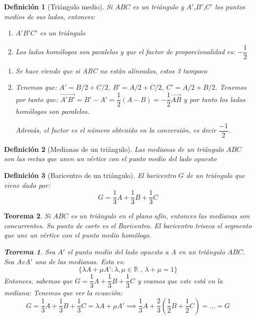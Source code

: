 \documentclass[11pt, a4paper, titlepage]{article}
\makeatletter
\renewenvironment{proof}[1][\proofname] {\vspace{-15pt}\par\pushQED{\qed}\normalfont\topsep6\p@\@plus6\p@\relax\trivlist\item[\hskip\labelsep\it#1\@addpunct{.}]\ignorespaces}{\popQED\endtrivlist\@endpefalse}
\newcommand{\R}{\mathbb{R}}
\theoremstyle{theorem-style}
\newtheorem*{nth}{Teorema}
\theoremstyle{definition-style}
\newtheorem*{ndef}{Definición}
\theoremstyle{remark-style}
\theoremstyle{example-style}
\newenvironment{nlist}
{\begin{enumerate}
\renewcommand\labelenumi{(\emph{\roman{enumi})}}}
{\end{enumerate}}
\makeatother
\begin{document}
\begin{ndef}[Triángulo medio]
	Si $ABC$ es un triángulo y $A'$,$B'$,$C'$ los puntos medios de sus lados, entonces:
	\begin{nlist}
	\item $A'B'C'$ es un triángulo
	\item Los lados homólogos son paralelos y que el factor de proporcionalidad es: $-\dfrac{1}{2}$
\end{nlist}\vspace{0.2cm}
\begin{proof}

	\begin{nlist}
	\item Se hace viendo que si ABC no están alineados, estos 3 tampoco
	\item Tenemos que: $A' = B/2 + C/2$, $B' = A/2+C/2$, $C' = A/2 + B/2$. Tenemos por tanto que: $\vec{A'B'} = B'-A' = \dfrac{1}{2}(A-B) = -\dfrac{1}{2} \vec{AB}$ y por tanto los lados homólogos son paralelos.

Además, el factor es el número obtenido en la conversión, es decir $\dfrac{-1}{2}$.
\end{nlist}
\end{proof}
\end{ndef}

\begin{ndef}[Medianas de un triángulo]
Las medianas de un triángulo $ABC$ son las rectas que unen un vértice con el punto medio del lado opuesto
\end{ndef}
\begin{ndef}[Baricentro de un triángulo]
	El baricentro $G$ de un triángulo que viene dado por:
	\[
	G = \dfrac{1}{3} A +  \dfrac{1}{3} B +  \dfrac{1}{3} C
	\]
\end{ndef}

\begin{nth}
	Si $ABC$ es un triángulo en el plano afín, entonces las medianas son concurrentes. Su punto de corte es el Baricentro. El baricentro triseca el segmento que une un vértice con el punto medio homólogo.
	
	\begin{nth}
	Sea $A'$ el punto medio del lado opuesto a A en un triángulo $ABC$. Sea $AvA'$ una de las medianas. Esta es:
	\[
	\{\lambda A + \mu A': \lambda, \mu \in \R \text{ , } \lambda+\mu = 1\}
	\]
	Entonces, sabemos que $G = \dfrac{1}{3} A +  \dfrac{1}{3} B +  \dfrac{1}{3} C$ y veamos que este está en la mediana: Tenemos que ver la ecuación:
	\[
	G = \dfrac{1}{3} A +  \dfrac{1}{3} B +  \dfrac{1}{3} C = \lambda A + \mu A'  \implies \dfrac{1}{3}A + \dfrac{2}{3}(\dfrac{1}{2}B+\dfrac{1}{2}C) = ... = G
	\]
	
\end{nth}
\end{nth}
\end{document}
